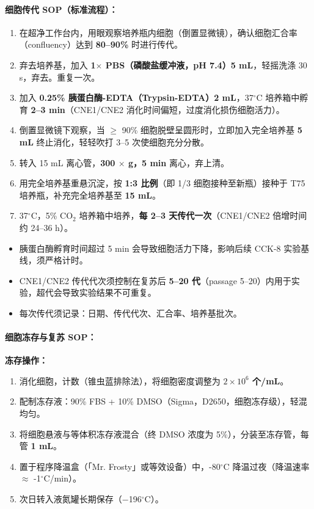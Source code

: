 \documentclass[12pt,a4paper,twoside]{article}
\begin{document}
\paragraph{细胞传代 SOP（标准流程）：}

\begin{enumerate}
  \item 在超净工作台内，用眼观察培养瓶内细胞（倒置显微镜），确认细胞汇合率（confluency）达到 \textbf{80--90\%} 时进行传代。
  \item 弃去培养基，加入 \textbf{1$\times$ PBS（磷酸盐缓冲液，pH 7.4）5 mL}，轻摇洗涤 30 s，弃去。重复一次。
  \item 加入 \textbf{0.25\% 胰蛋白酶-EDTA（Trypsin-EDTA）2 mL}，37$^{\circ}$C 培养箱中孵育 \textbf{2--3 min}（CNE1/CNE2 消化时间偏短，过度消化损伤细胞活力）。
  \item 倒置显微镜下观察，当 $\geq$ 90\% 细胞脱壁呈圆形时，立即加入完全培养基 \textbf{5 mL} 终止消化，轻轻吹打 3--5 次使细胞充分分散。
  \item 转入 15 mL 离心管，\textbf{300 $\times$ g，5 min} 离心，弃上清。
  \item 用完全培养基重悬沉淀，按 \textbf{1:3 比例}（即 1/3 细胞接种至新瓶）接种于 T75 培养瓶，补充完全培养基至 \textbf{15 mL}。
  \item 37$^{\circ}$C，5\% CO$_2$ 培养箱中培养，\textbf{每 2--3 天传代一次}（CNE1/CNE2 倍增时间约 24--36 h）。
\end{enumerate}

\begin{warningbox}
\begin{itemize}
  \item 胰蛋白酶孵育时间超过 5 min 会导致细胞活力下降，影响后续 CCK-8 实验基线，须严格计时。
  \item CNE1/CNE2 传代代次须控制在复苏后 \textbf{5--20 代}（passage 5--20）内用于实验，超代会导致实验结果不可重复。
  \item 每次传代须记录：日期、传代代次、汇合率、培养基批次。
\end{itemize}
\end{warningbox}

\paragraph{细胞冻存与复苏 SOP：}

\textbf{冻存操作：}
\begin{enumerate}
  \item 消化细胞，计数（锥虫蓝排除法），将细胞密度调整为 \textbf{$2 \times 10^6$ 个/mL}。
  \item 配制冻存液：90\% FBS + 10\% DMSO（Sigma，D2650，细胞冻存级），轻混均匀。
  \item 将细胞悬液与等体积冻存液混合（终 DMSO 浓度为 5\%），分装至冻存管，每管 \textbf{1 mL}。
  \item 置于程序降温盒（「Mr. Frosty」或等效设备）中，-80$^{\circ}$C 降温过夜（降温速率 $\approx$ -1$^{\circ}$C/min）。
  \item 次日转入液氮罐长期保存（$-$196$^{\circ}$C）。
\end{enumerate}
\end{document}
